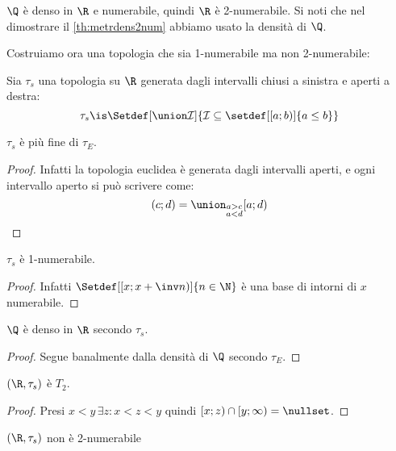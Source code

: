 \begin{es}
	$\Q$ è denso in $\R$ e numerabile, quindi $\R$ è 2-numerabile.
	Si noti che nel dimostrare il \autoref{th:metrdens2num} abbiamo usato la densità di $\Q$.
\end{es}

Costruiamo ora una topologia che sia 1-numerabile ma non 2-numerabile:

\begin{defn}
	Sia $\tau_s$ una topologia su $\R$ generata dagli intervalli chiusi a sinistra e aperti a destra:
	\[\tau_s\is\Setdef[\union\mathcal I]{\mathcal I\subseteq\setdef[[a;b)]{a\leq b}}\]
\end{defn}

\begin{prop}
	$\tau_s$ è più fine di $\tau_E$.
\end{prop}

\begin{proof}
	Infatti la topologia euclidea è generata dagli intervalli aperti,
	e ogni intervallo aperto si può scrivere come:
	\[(c;d)=\union_{\substack{a>c\\a<d}}[a;d)
	\qedhere\]
\end{proof}

\begin{prop}
	$\tau_s$ è 1-numerabile.
\end{prop}

\begin{proof}
	Infatti $\Setdef[\left[x;x+\inv n\right)]{n\in\N}$ è una base di intorni di $x$ numerabile.
\end{proof}

\begin{prop}
	$\Q$ è denso in $\R$ secondo $\tau_s$.
\end{prop}

\begin{proof}
	Segue banalmente dalla densità di $\Q$ secondo $\tau_E$.
\end{proof}

\begin{prop}
	$(\R,\tau_s)$ è $T_2$.
\end{prop}

\begin{proof}
	Presi $x<y\,\exists z:x<z<y$ quindi $[x;z)\cap[y;\infty)=\nullset$.
\end{proof}

\begin{prop}
	$(\R,\tau_s)$ non è 2-numerabile
\end{prop}

